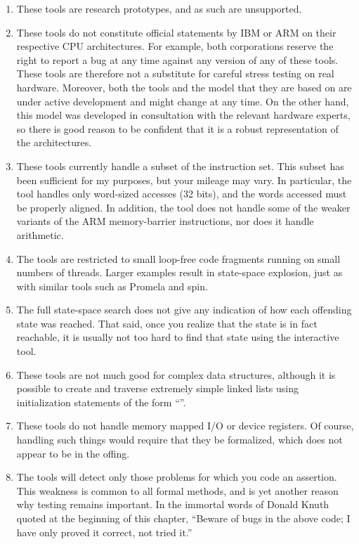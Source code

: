\begin{enumerate}
\item	These tools are research prototypes, and as such are unsupported.
\item	These tools do not constitute official statements by IBM or ARM
	on their respective CPU architectures. For example, both
	corporations reserve the right to report a bug at any time against
	any version of any of these tools. These tools are therefore not a
	substitute for careful stress testing on real hardware. Moreover,
	both the tools and the model that they are based on are under
	active development and might change at any time. On the other
	hand, this model was developed in consultation with the relevant
	hardware experts, so there is good reason to be confident that
	it is a robust representation of the architectures.
\item	These tools currently handle a subset of the instruction set.
	This subset has been sufficient for my purposes, but your mileage
	may vary. In particular, the tool handles only word-sized accesses
	(32 bits), and the words accessed must be properly aligned. In
	addition, the tool does not handle some of the weaker variants
	of the ARM memory-barrier instructions, nor does it handle arithmetic.
\item	The tools are restricted to small loop-free code fragments
	running on small numbers of threads. Larger examples result
	in state-space explosion, just as with similar tools such as
	Promela and spin.
\item	The full state-space search does not give any indication of how
	each offending state was reached. That said, once you realize
	that the state is in fact reachable, it is usually not too hard
	to find that state using the interactive tool.
\item	These tools are not much good for complex data structures, although
	it is possible to create and traverse extremely simple linked
	lists using initialization statements of the form
	``''.
\item	These tools do not handle memory mapped I/O or device registers.
	Of course, handling such things would require that they be
	formalized, which does not appear to be in the offing.
\item	The tools will detect only those problems for which you code an
	assertion. This weakness is common to all formal methods, and
	is yet another reason why testing remains important. In the
	immortal words of Donald Knuth quoted at the beginning of this
	chapter, ``Beware of bugs in the above
	code; I have only proved it correct, not tried it.''
\end{enumerate}


